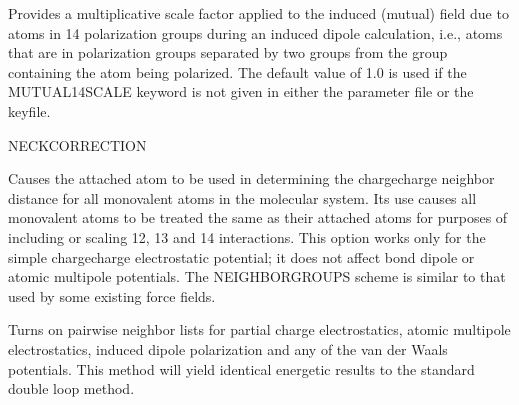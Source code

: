 \documentclass[letterpaper,11pt,english]{sphinxmanual}
\begin{document}
\ignorespaces {}\label{\detokenize{text/keywords:key-mutual-14-scale}}\begin{description}
\sphinxAtStartPar
Provides a multiplicative scale factor applied to the induced (mutual) field due to atoms in 1\sphinxhyphen{}4 polarization groups during an induced dipole calculation, i.e., atoms that are in polarization groups separated by two groups from the group containing the atom being polarized. The default value of 1.0 is used if the MUTUAL\sphinxhyphen{}14\sphinxhyphen{}SCALE keyword is not given in either the parameter file or the keyfile.

\end{description}

\ignorespaces {}\label{\detokenize{text/keywords:key-neck-correction}}
\sphinxAtStartPar
NECK\sphinxhyphen{}CORRECTION

\ignorespaces {}\label{\detokenize{text/keywords:key-neighbor-groups}}\begin{description}
\sphinxAtStartPar
Causes the attached atom to be used in determining the charge\sphinxhyphen{}charge neighbor distance for all monovalent atoms in the molecular system. Its use causes all monovalent atoms to be treated the same as their attached atoms for purposes of including or scaling 1\sphinxhyphen{}2, 1\sphinxhyphen{}3 and 1\sphinxhyphen{}4 interactions. This option works only for the simple charge\sphinxhyphen{}charge electrostatic potential; it does not affect bond dipole or atomic multipole potentials. The NEIGHBOR\sphinxhyphen{}GROUPS scheme is similar to that used by some existing force fields.

\end{description}

\ignorespaces {}\label{\detokenize{text/keywords:key-neighbor-list}}\begin{description}
\sphinxAtStartPar
Turns on pairwise neighbor lists for partial charge electrostatics, atomic multipole electrostatics, induced dipole polarization and any of the van der Waals potentials. This method will yield identical energetic results to the standard double loop method.

\end{description}
\end{document}
